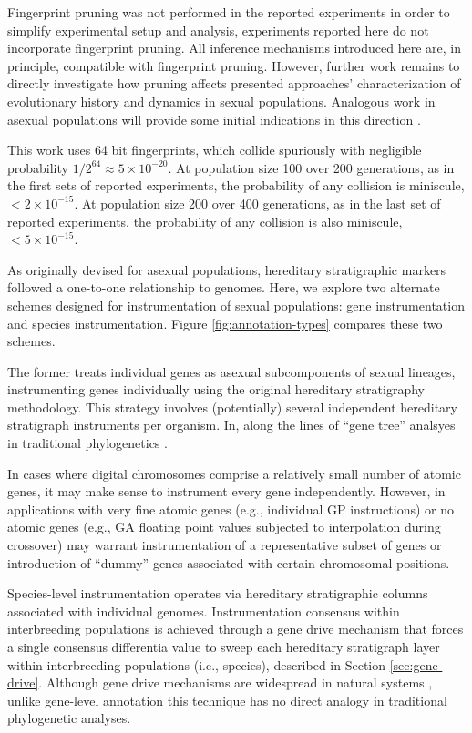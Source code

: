 Fingerprint pruning was not performed in the reported experiments in order to simplify experimental setup and analysis, experiments reported here do not incorporate fingerprint pruning.
All inference mechanisms introduced here are, in principle, compatible with fingerprint pruning.
However, further work remains to directly investigate how pruning affects presented approaches' characterization of evolutionary history and dynamics in sexual populations.
Analogous work in asexual populations will provide some initial indications in this direction \citep{moreno2023toward}.

This work uses 64 bit fingerprints, which collide spuriously with negligible probability $1/2^{64} \approx 5 \times 10^{-20}$.
At population size 100 over 200 generations, as in the first sets of reported experiments, the probability of any collision is miniscule, $< 2 \times 10^{-15}$.
At population size 200 over 400 generations, as in the last set of reported experiments, the probability of any collision is also miniscule, $< 5 \times 10^{-15}$.



As originally devised for asexual populations, hereditary stratigraphic markers followed a one-to-one relationship to genomes.
Here, we explore two alternate schemes designed for instrumentation of sexual populations: gene instrumentation and species instrumentation.
Figure \ref{fig:annotation-types} compares these two schemes.

The former treats individual genes as asexual subcomponents of sexual lineages, instrumenting genes individually using the original hereditary stratigraphy methodology.
This strategy involves (potentially) several independent hereditary stratigraph instruments per organism.
In, along the lines of ``gene tree'' analsyes in traditional phylogenetics \citep{avise1989gene}.

In cases where digital chromosomes comprise a relatively small number of atomic genes, it may make sense to instrument every gene independently.
However, in applications with very fine atomic genes (e.g., individual GP instructions) or no atomic genes (e.g., GA floating point values subjected to interpolation during crossover) may warrant instrumentation of a representative subset of genes or introduction of ``dummy'' genes associated with certain chromosomal positions.

Species-level instrumentation operates via hereditary stratigraphic columns associated with individual genomes.
Instrumentation consensus within interbreeding populations is achieved through a gene drive mechanism that forces a single consensus differentia value to sweep each hereditary stratigraph layer within interbreeding populations (i.e., species), described in Section \ref{sec:gene-drive}.
Although gene drive mechanisms are widespread in natural systems \citep{alphey2020standardizing, price2020resistance}, unlike gene-level annotation this technique has no direct analogy in traditional phylogenetic analyses.

